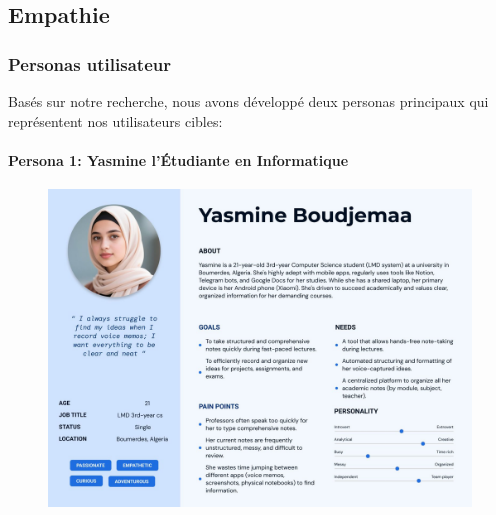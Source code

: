     \subsection{Empathie}
    
    \subsubsection{Personas utilisateur}
    
    Basés sur notre recherche, nous avons développé deux personas principaux qui représentent nos utilisateurs cibles:
    
    
    
    \paragraph{Persona 1: Yasmine l'Étudiante en Informatique}
    
    \begin{figure}[htbp]
        \centering
        \includegraphics[width=\textwidth]{assets/docs/yassmine-personaa.jpg}
    \end{figure}
    
